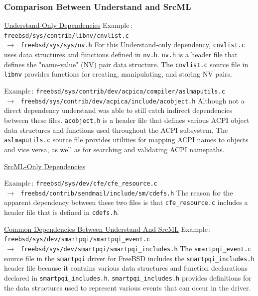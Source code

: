 \documentclass[12pt, dvipsnames, a4paper]{article}
\newcommand{\code}[1]{\texttt{#1}}
\begin{document}
\subsubsection{Comparison Between Understand and SrcML}
\underline{Understand-Only Dependencies}
\newline
\newline
Example$\,\colon\,$\texttt{freebsd/sys/contrib/libnv/cnvlist.c \\$\,\to\,$ freebsd/sys/sys/nv.h}
\newline
\newline
For this Understand-only dependency, \code{cnvlist.c} uses data structures and functions defined in \code{nv.h}. \code{nv.h} is a header file that defines the "name-value" (NV) pair data structure. The \code{cnvlist.c} source file in \code{libnv} provides functions for creating, manipulating, and storing NV pairs.

Example$\,\colon\,$\texttt{freebsd/sys/contrib/dev/acpica/compiler/aslmaputils.c \\$\,\to\,$ freebsd/sys/contrib/dev/acpica/include/acobject.h}
\newline
\newline
Although not a direct dependency understand was able to still catch indirect dependencies between these files. \code{acobject.h} is a header file that defines various ACPI object data structures and functions used throughout the ACPI subsystem. The \code{aslmaputils.c} source file provides utilities for mapping ACPI names to objects and vice versa, as well as for searching and validating ACPI namepaths.

\underline{SrcML-Only Dependencies}

Example$\,\colon\,$\texttt{freebsd/sys/dev/cfe/cfe\_resource.c \\$\,\to\,$ freebsd/contrib/sendmail/include/sm/cdefs.h}
\newline
\newline
The reason for the apparent dependency between these two files is that \code{cfe\_resource.c} includes a header file that is defined in \code{cdefs.h}.


\underline{Common Dependencies Between Understand And SrcML}
\newline
\newline
Example$\,\colon\,$\texttt{freebsd/sys/dev/smartpqi/smartpqi\_event.c \\$\,\to\,$ freebsd/sys/dev/smartpqi/smartpqi\_includes.h}
\newline
\newline
The \code{smartpqi\_event.c} source file in the \code{smartpqi} driver for FreeBSD includes the \code{smartpqi\_includes.h} header file because it contains various data structures and function declarations declared in \code{smartpqi\_includes.h}. \code{smartpqi\_includes.h}  provides definitions for the data structures used to represent various events that can occur in the driver.
\end{document}

